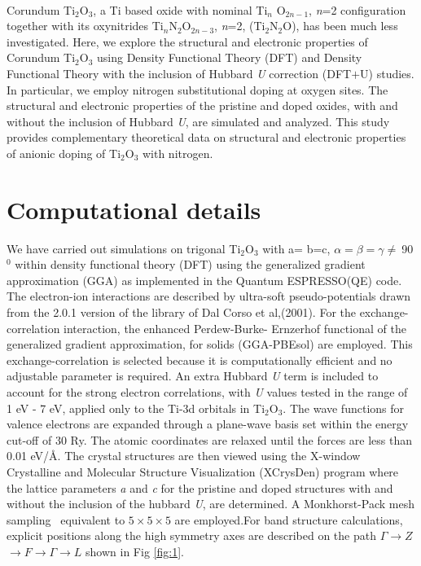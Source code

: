 \documentclass[aps,prb,superscriptaddress,twocolumn,floatfix,showpacs,amsmath]{revtex4-1}
\begin{document}
\\Corundum Ti$_{2}$O$_{3}$, a Ti based oxide with nominal Ti$_{n}$ O$_{2n-1}$, \textit{n}=2 configuration together with its oxynitrides Ti$_{n}$N$_{2}$O$_{2n-3}$, \textit{n}=2, (Ti$_{2}$N$_{2}$O), has been much less investigated. Here, we explore the structural and electronic properties of Corundum Ti$_{2}$O$_{3}$ using Density Functional Theory (DFT) and Density Functional Theory with the inclusion of Hubbard \textit {U} correction {(DFT$\pmb{+}$U)} \cite{himmetoglu2014hubbard} studies.  In particular, we employ nitrogen substitutional doping at oxygen sites. The structural and electronic properties of the pristine and doped oxides, with and without the inclusion of Hubbard \textit{U}, are simulated and analyzed.  This study provides complementary theoretical data on structural and electronic properties of anionic doping of Ti$_{2}$O$_{3}$ with nitrogen. \\

\section{Computational details}
We have carried out simulations on trigonal Ti$_{2}$O$_{3}$ with a= b=c, $\alpha=\beta=\gamma \neq \ $90$^0$ within density functional theory (DFT)\cite{Kohn-65} using the generalized gradient approximation (GGA) as implemented in the Quantum ESPRESSO(QE) code\cite{Giannozzi_2009}. The electron-ion interactions are described by ultra-soft pseudo-potentials\cite{PAW-PPS} drawn from the 2.0.1 version of the library of Dal Corso et al,(2001)\cite{carloelectronic}. For the exchange-correlation interaction, the enhanced Perdew-Burke- Ernzerhof functional of the generalized gradient approximation, for solids (GGA-PBEsol) \cite{PBE-1996} are employed. This exchange-correlation is selected because it is computationally efficient and no adjustable parameter is required. An extra Hubbard \textit{U} term is included to account for the strong electron correlations, with  \textit{U} values tested in the range of 1 eV - 7 eV, applied only to the Ti-3d orbitals in  Ti$_{2}$O$_{3}$. The wave functions for valence electrons are expanded through a plane-wave basis set within the energy cut-off of 30 Ry. The atomic coordinates are relaxed until the forces are less than 0.01 eV/Å. The crystal structures are then viewed using the X-window Crystalline and Molecular Structure Visualization (XCrysDen)\cite{kokalj2001xcrysden} program where the lattice parameters \textit{a} and \textit{c} for the pristine and doped structures with and without the inclusion of the hubbard \textit{U}, are determined. A Monkhorst-Pack mesh sampling~\cite{Monkhorst-76} equivalent to  $5 \times 5 \times 5$ are employed.For band structure calculations, explicit positions along the high symmetry axes are described on the path ${\Gamma}$$\rightarrow{Z}$$\rightarrow{F}$$\rightarrow$${\Gamma}$$\rightarrow{L}$\cite{setyawan2010high} shown in Fig \ref{fig:1}. 
\end{document}
